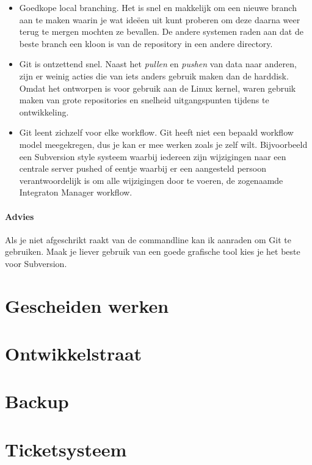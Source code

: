 \begin{itemize}
  \item Goedkope local branching. Het is snel en makkelijk om een nieuwe branch aan te maken waarin je wat ide\"{e}en uit kunt proberen om deze daarna weer terug te mergen mochten ze bevallen. De andere systemen raden aan dat de beste branch een kloon is van de repository in een andere directory.
  \item Git is ontzettend snel. Naast het \emph{pullen} en \emph{pushen} van data naar anderen, zijn er weinig acties die van iets anders gebruik maken dan de harddisk. Omdat het ontworpen is voor gebruik aan de Linux kernel, waren gebruik maken van grote repositories en snelheid uitgangspunten tijdens te ontwikkeling.
  \item Git leent zichzelf voor elke workflow. Git heeft niet een bepaald workflow model meegekregen, dus je kan er mee werken zoals je zelf wilt. Bijvoorbeeld een Subversion style systeem waarbij iedereen zijn wijzigingen naar een centrale server pushed of eentje waarbij er een aangesteld persoon verantwoordelijk is om alle wijzigingen door te voeren, de zogenaamde Integraton Manager workflow.
\end{itemize}

\paragraph{Advies} Als je niet afgeschrikt raakt van de commandline kan ik aanraden om Git te gebruiken. Maak je liever gebruik van een goede grafische tool kies je het beste voor Subversion.

\section{Gescheiden werken}



\section{Ontwikkelstraat}



\section{Backup}



\section{Ticketsysteem}

